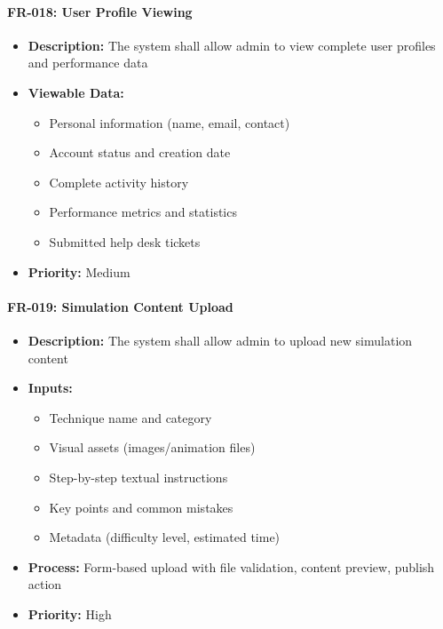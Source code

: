 \documentclass[12pt,a4paper]{article}
\begin{document}
\begin{enumerate}
\paragraph{FR-018: User Profile Viewing}
\begin{itemize}
    \item \textbf{Description:} The system shall allow admin to view complete user profiles and performance data
    \item \textbf{Viewable Data:}
    \begin{itemize}
        \item Personal information (name, email, contact)
        \item Account status and creation date
        \item Complete activity history
        \item Performance metrics and statistics
        \item Submitted help desk tickets
    \end{itemize}
    \item \textbf{Priority:} Medium
\end{itemize}

\paragraph{FR-019: Simulation Content Upload}
\begin{itemize}
    \item \textbf{Description:} The system shall allow admin to upload new simulation content
    \item \textbf{Inputs:}
    \begin{itemize}
        \item Technique name and category
        \item Visual assets (images/animation files)
        \item Step-by-step textual instructions
        \item Key points and common mistakes
        \item Metadata (difficulty level, estimated time)
    \end{itemize}
    \item \textbf{Process:} Form-based upload with file validation, content preview, publish action
    \item \textbf{Priority:} High
\end{itemize}


\end{enumerate}
\end{document}
